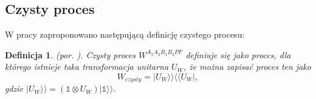 \documentclass[10pt]{article} %
\newtheorem{definicja}{Definicja}
\newcommand{\Ket}[1]{|#1\rangle}
\newcommand{\Bra}[1]{\langle#1|}
\newcommand{\BBra}[1]{\langle\langle#1|}
\newcommand{\KKet}[1]{|#1\rangle\rangle}
\newcommand{\I}{\mathbb{1}}
\begin{document}
\subsection{Czysty proces}
W pracy \cite{purification} zaproponowano następującą definicję czystego procesu:
\begin{definicja}
(por. \cite{purification}).
Czysty proces $W^{A_1A_2B_1B_2PF}$ definiuje się jako proces, dla którego istnieje taka transformacja unitarna $U_W$, że można zapisać proces ten jako
\begin{equation}
W_{czysty} = \KKet{U_W}\BBra{U_W},
\end{equation}
gdzie $\KKet{U_W} = (\I \otimes U_W)\KKet{\I}$.
\end{definicja}
\end{document}
